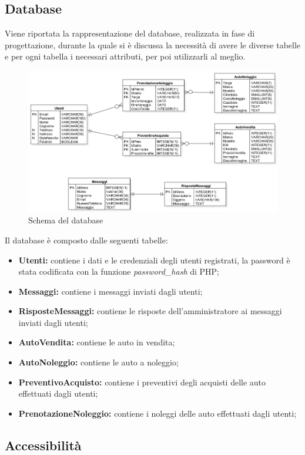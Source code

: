     \subsection{Database}
    Viene riportata la rappresentazione del database, realizzata in fase di progettazione, durante la quale si è discussa la necessità di avere le diverse tabelle e per ogni tabella i necessari attributi, per poi utilizzarli al meglio.
    \begin{figure}[H]
        \centering
        \includegraphics[width=14cm]{./img/database.png}
        \caption{Schema del database}  \label{fig:xray}
    \end{figure}
    Il database è composto dalle seguenti tabelle:
    \begin{itemize}
        \item \textbf{Utenti:} contiene i dati e le credenziali degli utenti registrati, la password è stata codificata con la funzione \textit{password\_hash} di PHP;
        \item \textbf{Messaggi:} contiene i messaggi inviati dagli utenti;
        \item \textbf{RisposteMessaggi:} contiene le risposte dell'amministratore ai messaggi inviati dagli utenti;
        \item \textbf{AutoVendita:} contiene le auto in vendita;
        \item \textbf{AutoNoleggio:} contiene le auto a noleggio;
        \item \textbf{PreventivoAcquisto:} contiene i preventivi degli acquisti delle auto effettuati dagli utenti;
        \item \textbf{PrenotazioneNoleggio:} contiene i noleggi delle auto effettuati dagli utenti;
    \end{itemize}

    \subsection{Accessibilità}

\pagebreak